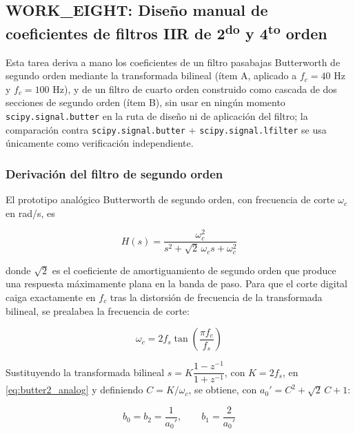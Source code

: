 
\subsection{WORK\_EIGHT: Diseño manual de coeficientes de filtros IIR de 2\textsuperscript{do} y 4\textsuperscript{to} orden}

Esta tarea deriva a mano los coeficientes de un filtro pasabajas Butterworth de segundo orden mediante la transformada bilineal (ítem A, aplicado a $f_c = 40$ Hz y $f_c = 100$ Hz), y de un filtro de cuarto orden construido como cascada de dos secciones de segundo orden (ítem B), sin usar en ningún momento \texttt{scipy.signal.butter} en la ruta de diseño ni de aplicación del filtro; la comparación contra \texttt{scipy.signal.butter} + \texttt{scipy.signal.lfilter} se usa únicamente como verificación independiente.

\subsubsection{Derivación del filtro de segundo orden}

El prototipo analógico Butterworth de segundo orden, con frecuencia de corte $\omega_c$ en rad/s, es

\begin{equation}
H(s) = \frac{\omega_c^2}{s^2 + \sqrt{2}\,\omega_c s + \omega_c^2}
\label{eq:butter2_analog}
\end{equation}

donde $\sqrt{2}$ es el coeficiente de amortiguamiento de segundo orden que produce una respuesta máximamente plana en la banda de paso. Para que el corte digital caiga exactamente en $f_c$ tras la distorsión de frecuencia de la transformada bilineal, se prealabea la frecuencia de corte:

\begin{equation}
\omega_c = 2 f_s \tan\!\left(\frac{\pi f_c}{f_s}\right)
\label{eq:prewarp}
\end{equation}

Sustituyendo la transformada bilineal $s = K\dfrac{1-z^{-1}}{1+z^{-1}}$, con $K = 2f_s$, en \eqref{eq:butter2_analog} y definiendo $C = K/\omega_c$, se obtiene, con $a_0' = C^2 + \sqrt{2}\,C + 1$:

\begin{equation}
b_0 = b_2 = \frac{1}{a_0'}, \qquad b_1 = \frac{2}{a_0'}
\label{eq:b_coefs}
\end{equation}

